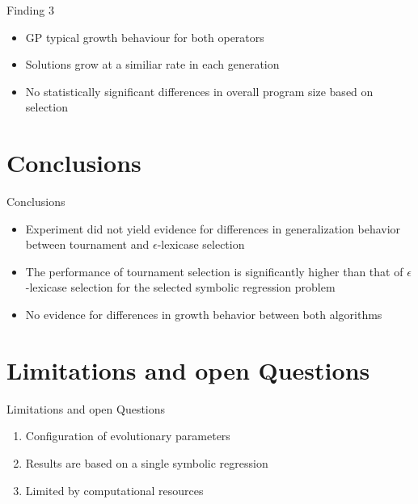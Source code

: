 \documentclass[
  ignorenonframetext,
]{beamer}
\providecommand{\tightlist}{%
  \setlength{\itemsep}{0pt}\setlength{\parskip}{0pt}}
\begin{document}
\begin{frame}{Finding 3}
\protect\hypertarget{finding-3}{}
\begin{itemize}
\tightlist
\item
  GP typical growth behaviour for both operators
\item
  Solutions grow at a similiar rate in each generation
\item
  No statistically significant differences in overall program size based
  on selection
\end{itemize}
\end{frame}

\hypertarget{conclusions}{%
\section{Conclusions}\label{conclusions}}

\begin{frame}{Conclusions}
\begin{itemize}
\tightlist
\item
  Experiment did not yield evidence for differences in generalization
  behavior between tournament and \(\epsilon\)-lexicase selection
\item
  The performance of tournament selection is significantly higher than
  that of \(\epsilon\)-lexicase selection for the selected symbolic
  regression problem
\item
  No evidence for differences in growth behavior between both algorithms
\end{itemize}
\end{frame}

\hypertarget{limitations-and-open-questions}{%
\section{Limitations and open
Questions}\label{limitations-and-open-questions}}

\begin{frame}{Limitations and open Questions}
\begin{enumerate}
\tightlist
\item
  Configuration of evolutionary parameters
\item
  Results are based on a single symbolic regression
\item
  Limited by computational resources
\end{enumerate}
\end{frame}
\end{document}
